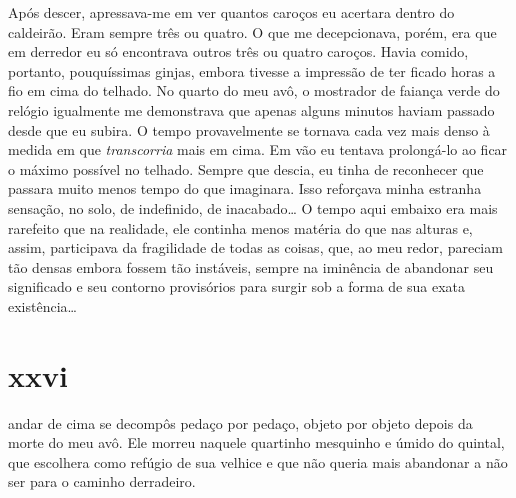 

Após descer, apressava-me em ver quantos caroços eu acertara dentro do
caldeirão. Eram sempre três ou quatro. O que me decepcionava, porém, era que
em derredor eu só encontrava outros três ou quatro caroços. Havia comido,
portanto, pouquíssimas ginjas, embora tivesse a impressão de ter ficado horas
a fio em cima do telhado. No quarto do meu avô, o mostrador de faiança verde
do relógio igualmente me demonstrava que apenas alguns minutos haviam passado
desde que eu subira. O tempo provavelmente se tornava cada vez mais denso à
medida em que \textit{transcorria} mais em cima. Em vão eu tentava
prolongá-lo ao ficar o máximo possível no telhado. Sempre que descia, eu
tinha de reconhecer que passara muito menos tempo do que imaginara. Isso
reforçava minha estranha sensação, no solo, de indefinido, de inacabado\ldots
{} O tempo aqui embaixo era mais rarefeito que na realidade, ele continha
menos matéria do que nas alturas e, assim, participava da fragilidade de
todas as coisas, que, ao meu redor, pareciam tão densas embora fossem tão
instáveis, sempre na iminência de abandonar seu significado e seu contorno
provisórios para surgir sob a forma de sua exata existência\ldots{}


\section{xxvi} 

andar de cima se decompôs pedaço por pedaço, objeto por
 objeto depois da morte do meu avô. Ele morreu naquele quartinho mesquinho e
 úmido do quintal, que escolhera como refúgio de sua velhice e que não queria
 mais abandonar a não ser para o caminho derradeiro.


